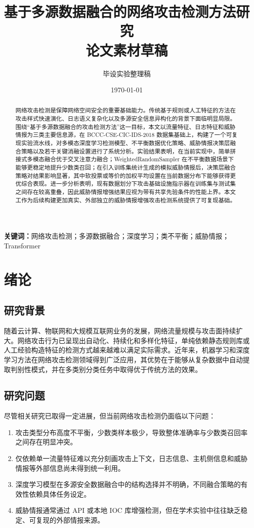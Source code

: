 \documentclass[UTF8,a4paper,12pt]{ctexart}
\title{基于多源数据融合的网络攻击检测方法研究\\论文素材草稿}
\author{毕设实验整理稿}
\date{\today}
\begin{document}
\maketitle

\begin{abstract}
网络攻击检测是保障网络空间安全的重要基础能力。传统基于规则或人工特征的方法在攻击样式快速演化、日志语义复杂化以及多源安全信息异构化的背景下面临明显局限。围绕“基于多源数据融合的攻击检测方法”这一目标，本文以流量特征、日志特征和威胁情报为三类主要信息源，在 BCCC-CSE-CIC-IDS-2018 数据集基础上，构建了一个可复现实验流水线，对多模态深度学习检测模型、不平衡数据优化策略、威胁情报决策层融合策略以及若干关键消融设置进行了系统分析。实验结果表明，在当前实现中，简单拼接式多模态融合优于交叉注意力融合；WeightedRandomSampler 在不平衡数据场景下能够更稳定地提升少数类召回；在引入训练集统计生成的模拟威胁情报后，决策层融合策略对结果影响显著，其中软投票或等价的加权平均设置在当前数据分布下能够获得更优综合表现。进一步分析表明，现有数据划分下攻击基础设施指示器在训练集与测试集之间存在较高重叠，因此威胁情报增强结果应视为带有共享先验条件的性能上界。本文工作为后续构建更加真实、外部独立的威胁情报增强攻击检测系统提供了可复现基础。
\end{abstract}

\noindent\textbf{关键词：}网络攻击检测；多源数据融合；深度学习；类不平衡；威胁情报；Transformer

\section{绪论}
\subsection{研究背景}
随着云计算、物联网和大规模互联网业务的发展，网络流量规模与攻击面持续扩大。网络攻击行为已呈现出自动化、持续化和多样化特征，单纯依赖静态规则库或人工经验构造特征的检测方式越来越难以满足实际需求。近年来，机器学习和深度学习方法在网络攻击检测领域得到广泛应用，其优势在于能够从复杂数据中自动提取判别性模式，并在多类别分类任务中取得优于传统方法的效果。

\subsection{研究问题}
尽管相关研究已取得一定进展，但当前网络攻击检测仍面临以下问题：
\begin{enumerate}[leftmargin=2em]
    \item 攻击类型分布高度不平衡，少数类样本极少，导致整体准确率与少数类召回率之间存在明显冲突。
    \item 仅依赖单一流量特征难以充分刻画攻击上下文，日志信息、主机侧信息和威胁情报等外部信息尚未得到统一利用。
    \item 深度学习模型在多源安全数据融合中的结构选择并不明确，不同融合策略的有效性依赖具体任务设定。
    \item 威胁情报通常通过 API 或本地 IOC 库增强检测，但在学术实验中往往缺乏稳定、可复现的外部情报来源。
\end{enumerate}
\end{document}
